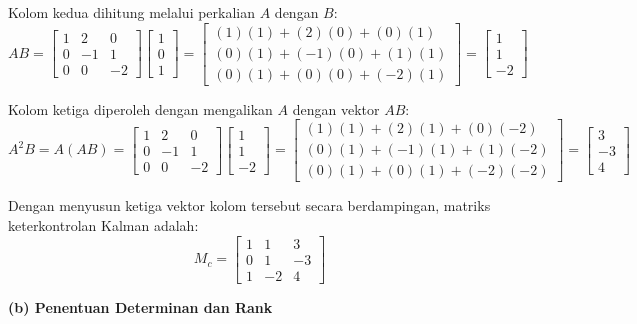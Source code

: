 \documentclass[11pt,a4paper]{article}
\begin{document}
Kolom kedua dihitung melalui perkalian $A$ dengan $B$:
$$AB = \begin{bmatrix} 1 & 2 & 0 \\ 0 & -1 & 1 \\ 0 & 0 & -2 \end{bmatrix} \begin{bmatrix} 1 \\ 0 \\ 1 \end{bmatrix} = \begin{bmatrix} (1)(1) + (2)(0) + (0)(1) \\ (0)(1) + (-1)(0) + (1)(1) \\ (0)(1) + (0)(0) + (-2)(1) \end{bmatrix} = \begin{bmatrix} 1 \\ 1 \\ -2 \end{bmatrix}$$

Kolom ketiga diperoleh dengan mengalikan $A$ dengan vektor $AB$:
$$A^2B = A(AB) = \begin{bmatrix} 1 & 2 & 0 \\ 0 & -1 & 1 \\ 0 & 0 & -2 \end{bmatrix} \begin{bmatrix} 1 \\ 1 \\ -2 \end{bmatrix} = \begin{bmatrix} (1)(1) + (2)(1) + (0)(-2) \\ (0)(1) + (-1)(1) + (1)(-2) \\ (0)(1) + (0)(1) + (-2)(-2) \end{bmatrix} = \begin{bmatrix} 3 \\ -3 \\ 4 \end{bmatrix}$$

Dengan menyusun ketiga vektor kolom tersebut secara berdampingan, matriks keterkontrolan Kalman adalah:
$$M_c = \begin{bmatrix} 1 & 1 & 3 \\ 0 & 1 & -3 \\ 1 & -2 & 4 \end{bmatrix}$$

\textbf{(b) Penentuan Determinan dan Rank}
\end{document}

